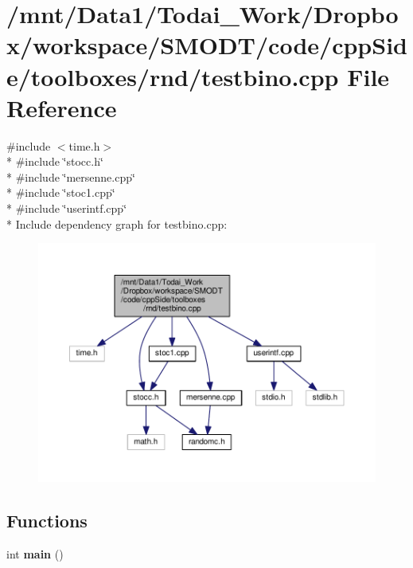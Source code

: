 \section{/mnt/\-Data1/\-Todai\-\_\-\-Work/\-Dropbox/workspace/\-S\-M\-O\-D\-T/code/cpp\-Side/toolboxes/rnd/testbino.cpp File Reference}
\label{toolboxes_2rnd_2testbino_8cpp}
{\ttfamily \#include $<$time.\-h$>$}\\*
{\ttfamily \#include \char`\"{}stocc.\-h\char`\"{}}\\*
{\ttfamily \#include \char`\"{}mersenne.\-cpp\char`\"{}}\\*
{\ttfamily \#include \char`\"{}stoc1.\-cpp\char`\"{}}\\*
{\ttfamily \#include \char`\"{}userintf.\-cpp\char`\"{}}\\*
Include dependency graph for testbino.\-cpp\-:\nopagebreak
\begin{figure}[H]
\begin{center}
\leavevmode
\includegraphics[width=350pt]{toolboxes_2rnd_2testbino_8cpp__incl}
\end{center}
\end{figure}
\subsection*{Functions}
\begin{DoxyCompactItemize}
\item 
int {\bf main} ()
\end{DoxyCompactItemize}


